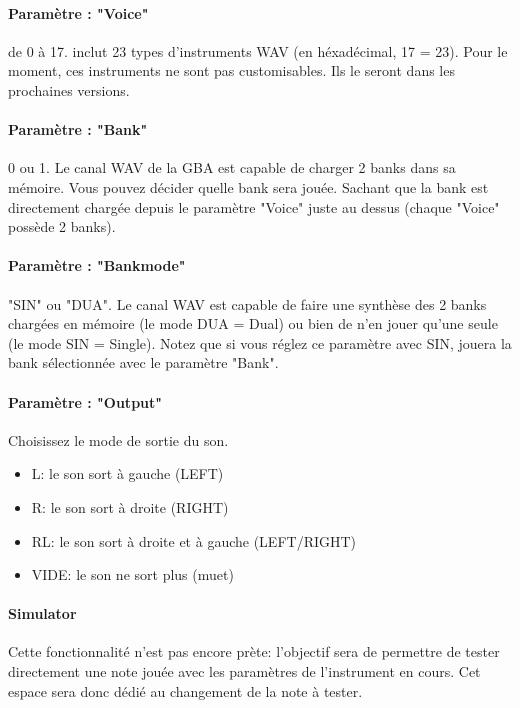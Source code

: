 \documentclass[12pt,a4paper]{article}
\begin{document}
        \paragraph{Paramètre : "Voice"} de 0 à 17. \FAT inclut 23 types d'instruments WAV (en héxadécimal, 17 = 23). Pour le moment, ces instruments ne sont pas customisables. Ils le seront dans les prochaines versions.
        
        \paragraph{Paramètre : "Bank"} 0 ou 1. Le canal WAV de la GBA est capable de charger 2 banks dans sa mémoire. Vous pouvez décider quelle bank sera jouée. Sachant que la bank est directement chargée depuis le paramètre "Voice" juste au dessus (chaque "Voice" possède 2 banks).
        
        \paragraph{Paramètre : "Bankmode"} "SIN" ou "DUA". Le canal WAV est capable de faire une synthèse des 2 banks chargées en mémoire (le mode DUA = Dual) ou bien de n'en jouer qu'une seule (le mode SIN = Single). Notez que si vous réglez ce paramètre avec SIN, \FAT jouera la bank sélectionnée avec le paramètre "Bank".
        
        \paragraph{Paramètre : "Output"} Choisissez le mode de sortie du son.
            \begin{itemize}
                \item{L: le son sort à gauche (LEFT)}
                \item{R: le son sort à droite (RIGHT)}
                \item{RL: le son sort à droite et à gauche (LEFT/RIGHT)}
                \item{VIDE: le son ne sort plus (muet)}
            \end{itemize}
        
        \paragraph{Simulator} Cette fonctionnalité n'est pas encore prète: l'objectif sera de permettre de tester directement une note jouée avec les paramètres de l'instrument en cours. Cet espace sera donc dédié au changement de la note à tester.
        
\end{document}
